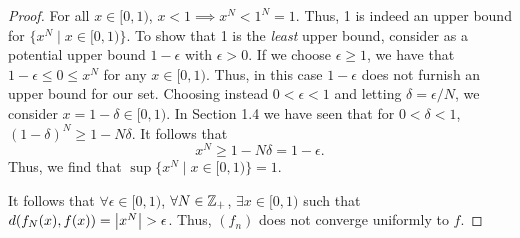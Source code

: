 \begin{solution}
\begin{proof}
    For all $x \in [0, 1)$, $x < 1 \implies x^N < 1^N = 1$.
    Thus, 1 is indeed an upper bound for $\{x^N \mid x \in [0, 1)\}$.
    To show that 1 is the \textit{least} upper bound, consider as a potential upper bound $1 - \epsilon$ with $\epsilon > 0$.
    If we choose $\epsilon \geq 1$, we have that $1 - \epsilon \leq 0 \leq x^N$ for any $x \in [0, 1)$.
    Thus, in this case $1 - \epsilon$ does not furnish an upper bound for our set.
    Choosing instead $0 < \epsilon < 1$ and letting $\delta = \epsilon / N$, we consider $x = 1 - \delta \in [0, 1)$.
    In Section 1.4 we have seen that for $0 < \delta < 1$, $(1 - \delta)^N \geq 1 - N \delta$.
    It follows that
    \begin{equation*}
      x^N \geq 1 - N \delta = 1 - \epsilon.
    \end{equation*}
    Thus, we find that $\sup\{x^N \mid x \in [0, 1)\} = 1$.

    It follows that $\forall \epsilon \in [0, 1)$, $\forall N \in \mathbb{Z}_+$, $\exists x \in [0, 1)$ such that $d(f_N(x), f(x)) = \left| x^N \right| > \epsilon$.
    Thus, $(f_n)$ does not converge uniformly to $f$.
  \end{proof}
\end{solution}
\newpage


